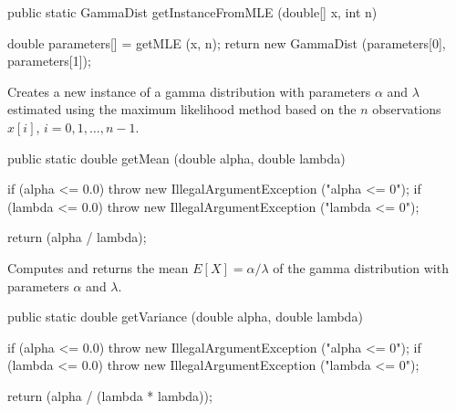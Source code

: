 \begin{htmlonly}
\end{htmlonly}
\begin{code}

   public static GammaDist getInstanceFromMLE (double[] x, int n)\begin{hide} {
      double parameters[] = getMLE (x, n);
      return new GammaDist (parameters[0], parameters[1]);
   }\end{hide}
\end{code}
\begin{tabb}
   Creates a new instance of a gamma distribution with parameters $\alpha$ and $\lambda$
   estimated using the maximum likelihood method based on the $n$ observations
   $x[i]$, $i = 0, 1, \ldots, n-1$.
\end{tabb}
\begin{htmlonly}
\end{htmlonly}
\begin{code}

   public static double getMean (double alpha, double lambda)\begin{hide} {
      if (alpha <= 0.0)
         throw new IllegalArgumentException ("alpha <= 0");
      if (lambda <= 0.0)
         throw new IllegalArgumentException ("lambda <= 0");

      return (alpha / lambda);
   }\end{hide}
\end{code}
\begin{tabb}  Computes and returns the mean $E[X] = \alpha/\lambda$
   of the gamma distribution with parameters $\alpha$ and $\lambda$.
\end{tabb}
\begin{htmlonly}
\end{htmlonly}
\begin{code}

   public static double getVariance (double alpha, double lambda)\begin{hide} {
      if (alpha <= 0.0)
         throw new IllegalArgumentException ("alpha <= 0");
      if (lambda <= 0.0)
         throw new IllegalArgumentException ("lambda <= 0");

      return (alpha / (lambda * lambda));
   }\end{hide}
\end{code}

